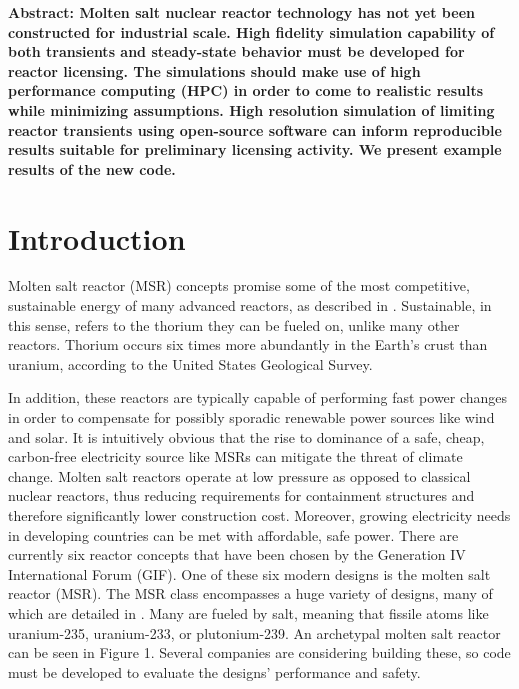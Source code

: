 \textbf{Abstract: Molten salt nuclear reactor technology has not yet been constructed for industrial scale.
 High fidelity simulation capability of both transients and steady-state behavior must be developed
for reactor licensing. The simulations should make use of high performance computing (HPC) in order
to come to realistic results while minimizing assumptions. High resolution simulation of limiting reactor transients using
open-source software can inform reproducible results suitable for preliminary licensing activity. We present example results of the new code.}

\newpage

\section{Introduction}

Molten salt reactor (MSR) concepts promise some of the most competitive, 
sustainable energy of many advanced reactors, as described in 
\cite{siemer_why_2015}. Sustainable, in this sense, refers to the thorium they 
can be fueled on, unlike many other reactors. Thorium occurs six times more 
abundantly in the Earth’s crust than uranium, according to the United States 
Geological Survey.

In addition, these reactors are typically capable of performing fast power changes in order to compensate for possibly sporadic renewable power sources like wind and solar. It is intuitively obvious that the rise to dominance of a safe, cheap, carbon-free electricity source like MSRs can mitigate the threat of climate change. Molten salt reactors operate at low pressure as opposed to classical nuclear reactors, thus reducing requirements for containment structures and therefore significantly lower construction cost. Moreover, growing electricity needs in developing countries can be met with affordable, safe power. There are currently six reactor concepts that have been chosen by the Generation IV International Forum (GIF). One of these six modern designs is the molten salt reactor (MSR). The MSR class encompasses a huge variety of designs, many of which are detailed in \cite{dolan}. Many are fueled by salt, meaning that fissile atoms like uranium-235, uranium-233, or plutonium-239. An archetypal molten salt reactor can be seen in Figure 1. Several companies \cite{6comp_2015} are considering building these, so code must be developed to evaluate the designs’ performance and safety.

